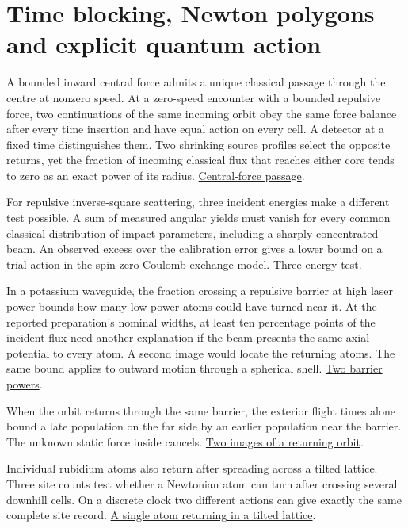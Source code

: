 \documentclass[11pt,a4paper]{article}
\begin{document}
\section{Time blocking, Newton polygons and explicit quantum
action}\label{time-blocking-newton-polygons-and-explicit-quantum-action}

A bounded inward central force admits a unique classical passage through
the centre at nonzero speed. At a zero-speed encounter with a bounded
repulsive force, two continuations of the same incoming orbit obey the
same force balance after every time insertion and have equal action on
every cell. A detector at a fixed time distinguishes them. Two shrinking
source profiles select the opposite returns, yet the fraction of
incoming classical flux that reaches either core tends to zero as an
exact power of its radius.
\hyperref[central-force-passage-under-point-insertion]{Central-force
passage}.

For repulsive inverse-square scattering, three incident energies make a
different test possible. A sum of measured angular yields must vanish
for every common classical distribution of impact parameters, including
a sharply concentrated beam. An observed excess over the calibration
error gives a lower bound on a trial action in the spin-zero Coulomb
exchange model.
\hyperref[a-three-energy-test-of-central-force-trajectories]{Three-energy
test}.

In a potassium waveguide, the fraction crossing a repulsive barrier at
high laser power bounds how many low-power atoms could have turned near
it. At the reported preparation's nominal widths, at least ten
percentage points of the incident flux need another explanation if the
beam presents the same axial potential to every atom. A second image
would locate the returning atoms. The same bound applies to outward
motion through a spherical shell.
\hyperref[locating-a-turn-with-two-barrier-powers]{Two barrier powers}.

When the orbit returns through the same barrier, the exterior flight
times alone bound a late population on the far side by an earlier
population near the barrier. The unknown static force inside cancels.
\hyperref[two-images-of-a-returning-orbit]{Two images of a returning
orbit}.

Individual rubidium atoms also return after spreading across a tilted
lattice. Three site counts test whether a Newtonian atom can turn after
crossing several downhill cells. On a discrete clock two different
actions can give exactly the same complete site record.
\hyperref[a-single-atom-returning-in-a-tilted-lattice]{A single atom
returning in a tilted lattice}.
\end{document}
